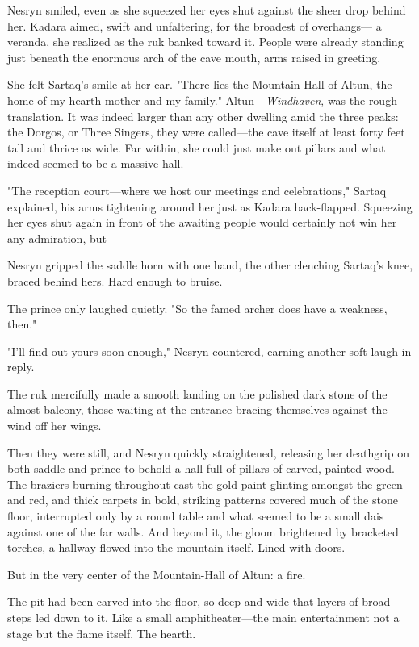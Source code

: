 Nesryn smiled, even as she squeezed her eyes shut against the sheer drop behind her.
Kadara aimed, swift and unfaltering, for the broadest of overhangs--- a veranda, she realized as the ruk banked toward it.
People were already standing just beneath the enormous arch of the cave mouth, arms raised in greeting.

She felt Sartaq's smile at her ear.
"There lies the Mountain-Hall of Altun, the home of my hearth-mother and my family."
Altun---\emph{Windhaven}, was the rough translation.
It was indeed larger than any other dwelling amid the three peaks: the Dorgos, or Three Singers, they were called---the cave itself at least forty feet tall and thrice as wide.
Far within, she could just make out pillars and what indeed seemed to be a massive hall.

"The reception court---where we host our meetings and celebrations," Sartaq explained, his arms tightening around her just as Kadara back-flapped.
Squeezing her eyes shut again in front of the awaiting people would certainly not win her any admiration, but---

Nesryn gripped the saddle horn with one hand, the other clenching Sartaq's knee, braced behind hers.
Hard enough to bruise.

The prince only laughed quietly.
"So the famed archer does have a weakness, then."

"I'll find out yours soon enough," Nesryn countered, earning another soft laugh in reply.

The ruk mercifully made a smooth landing on the polished dark stone of the almost-balcony, those waiting at the entrance bracing themselves against the wind off her wings.

Then they were still, and Nesryn quickly straightened, releasing her deathgrip on both saddle and prince to behold a hall full of pillars of carved, painted wood.
The braziers burning throughout cast the gold paint glinting amongst the green and red, and thick carpets in bold, striking patterns covered much of the stone floor, interrupted only by a round table and what seemed to be a small dais against one of the far walls.
And beyond it, the gloom brightened by bracketed torches, a hallway flowed into the mountain itself.
Lined with doors.

But in the very center of the Mountain-Hall of Altun: a fire.

The pit had been carved into the floor, so deep and wide that layers of broad steps led down to it.
Like a small amphitheater---the main entertainment not a stage but the flame itself.
The hearth.

